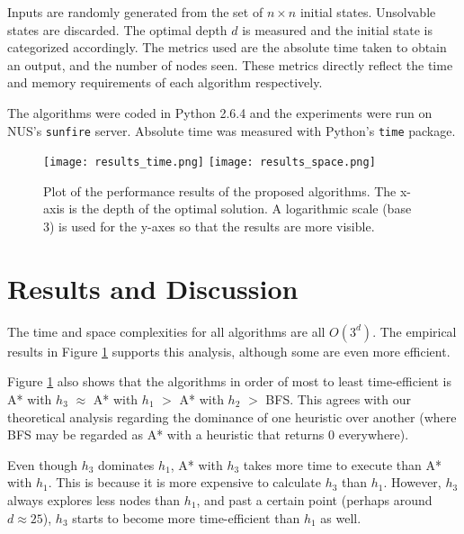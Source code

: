 \documentclass[runningheads]{llncs}
\begin{document}
Inputs are randomly generated from the set of $n \times n$ initial states. Unsolvable states are discarded. The optimal depth $d$ is measured and the initial state is categorized accordingly.
The metrics used are the absolute time taken to obtain an output, and the number of nodes seen. These metrics directly reflect the time and memory requirements of each algorithm respectively.

The algorithms were coded in Python 2.6.4 and the experiments were run on NUS's \texttt{sunfire} server. Absolute time was measured with Python's \texttt{time} package.

\begin{figure}[h!]
	\centering
	\texttt{[image: results\_time.png]}
	\texttt{[image: results\_space.png]}
	\caption{Plot of the performance results of the proposed algorithms. The x-axis is the depth of the optimal solution. A logarithmic scale (base 3) is used for the y-axes so that the results are more visible.} \label{fig:results}
\end{figure}



\section{Results and Discussion}
The time and space complexities for all algorithms are all $O(3^d)$.
The empirical results in Figure \ref{fig:results} supports this analysis, although some are even more efficient.

Figure \ref{fig:results} also shows that the algorithms in order of most to least time-efficient is A* with $h_3$ $\approx$ A* with $h_1$ $>$ A* with $h_2$ $>$ BFS. This agrees with our theoretical analysis regarding the dominance of one heuristic over another (where BFS may be regarded as A* with a heuristic that returns 0 everywhere).

Even though $h_3$ dominates $h_1$, A* with $h_3$ takes more time to execute than A* with $h_1$. This is because it is more expensive to calculate $h_3$ than $h_1$. However, $h_3$ always explores less nodes than $h_1$, and past a certain point (perhaps around $d \approx 25$), $h_3$ starts to become more time-efficient than $h_1$ as well.

\end{document}
